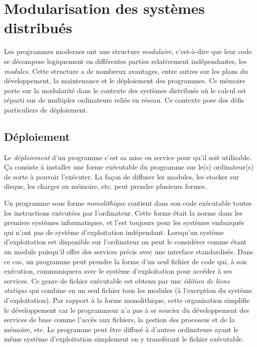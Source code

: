 
\chapter[]{Modularisation des systèmes distribués}%

Les programmes modernes ont une structure \textit{modulaire},
c'est-à-dire que leur code se décompose logiquement en différentes
parties relativement indépendantes, les \textit{modules}.  Cette
structure a de nombreux avantages, entre autres sur les plans du
développement, la maintenance et le déploiement des programmes.  Ce
mémoire porte sur la modularité dans le contexte des systèmes
distribués où le calcul est réparti sur de multiples ordinateurs
reliés en réseau.  Ce contexte pose des défis particuliers de
déploiement.

\section{Déploiement}

Le \textit{déploiement} d'un programme c'est sa mise en service pour
qu'il soit utilisable.  Ça consiste à installer une forme exécutable
du programme sur le(s) ordinateur(s) de sorte à pouvoir l'exécuter.
La façon de diffuser les modules, les stocker sur disque, les charger
en mémoire, etc. peut prendre plusieurs formes.

Un programme sous forme \textit{monolithique} contient dans son code exécutable
toutes les instructions exécutées par l'ordinateur.  Cette forme était la norme
dans les premiers systèmes informatiques, et l'est toujours pour les systèmes
embarqués qui n'ont pas de système d'exploitation indépendant.  Lorsqu'un
système d'exploitation est disponible sur l'ordinateur on peut le considérer
comme étant un module puisqu'il offre des services précis avec une interface
standardisée.  Dans ce cas, un programme peut prendre la forme d'un seul
fichier de code qui, à son exécution, communiquera avec le système
d'exploitation pour accéder à ses services.  Ce genre de fichier exécutable est
obtenu par une \textit{édition de liens statique} qui combine en un seul
fichier tous les modules (à l'exception du système d'exploitation).  Par
rapport à la forme monolithique, cette organisation simplifie le développement
car le programmeur n'a pas à se soucier du développement des services de base
comme l'accès aux fichiers, la gestion des processus et de la mémoire, etc.  Le
programme peut être diffusé à d'autres ordinateurs ayant le même système
d'exploitation simplement en y transférant le fichier exécutable.

